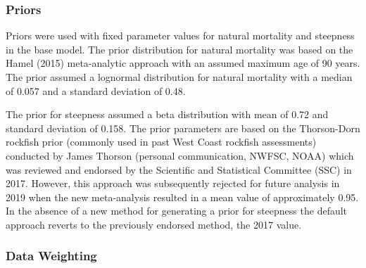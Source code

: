 \documentclass[11pt,
  english,
  a4paper,
]{article}
\begin{document}
\leavevmode\tagmcend\tagstructend\par


\hypertarget{priors}{%
\subsubsection{Priors}\label{priors}}

\leavevmode\tagmcend\tagstructend


Priors were used with fixed parameter values for natural mortality and steepness in the base model. The prior distribution for natural mortality was based on the Hamel {(2015)\leavevmode\tagmcend\tagstructend} meta-analytic approach with an assumed maximum age of 90 years. The prior assumed a lognormal distribution for natural mortality with a median of 0.057 and a standard deviation of 0.48.

\leavevmode\tagmcend\tagstructend\par


The prior for steepness assumed a beta distribution with mean of 0.72 and standard deviation of 0.158. The prior parameters are based on the Thorson-Dorn rockfish prior (commonly used in past West Coast rockfish assessments) conducted by James Thorson (personal communication, NWFSC, NOAA) which was reviewed and endorsed by the Scientific and Statistical Committee (SSC) in 2017. However, this approach was subsequently rejected for future analysis in 2019 when the new meta-analysis resulted in a mean value of approximately 0.95. In the absence of a new method for generating a prior for steepness the default approach reverts to the previously endorsed method, the 2017 value.

\leavevmode\tagmcend\tagstructend\par


\hypertarget{data-weighting}{%
\subsubsection{Data Weighting}\label{data-weighting}}

\leavevmode\tagmcend\tagstructend
\end{document}
